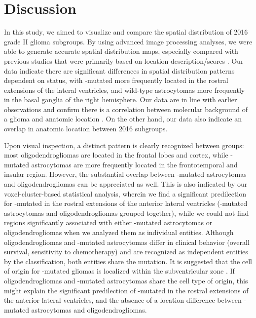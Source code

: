 \section{Discussion}
In this study, we aimed to visualize and compare the spatial distribution of  2016 grade II glioma subgroups.
By using advanced image processing analyses, we were able to generate accurate spatial distribution maps, especially compared with previous studies that were primarily based on location description/scores \autocite{stockhammer2012idh1, goze2009lack, laigle2004correlations, metellus2010absence}.
Our data indicate there are significant differences in spatial distribution patterns dependent on  status, with -mutated  more frequently located in the rostral extensions of the lateral ventricles, and  wild-type astrocytomas more frequently in the basal ganglia of the right hemisphere.
Our data are in line with earlier observations and confirm there is a correlation between molecular background of a glioma and anatomic location \autocite{stockhammer2012idh1, goze2009lack, laigle2004correlations, metellus2010absence, tejada2018voxel}.
On the other hand, our data also indicate an overlap in anatomic location between  2016 subgroups.

Upon visual inspection, a distinct pattern is clearly recognized between groups: most oligodendrogliomas are located in the frontal lobes and cortex, while -mutated astrocytomas are more frequently located in the frontotemporal and insular region.
However, the substantial overlap between -mutated astrocytomas and oligodendrogliomas can be appreciated as well.
This is also indicated by our voxel-cluster-based statistical analysis, wherein we find a significant predilection for -mutated  in the rostral extensions of the anterior lateral ventricles (-mutated astrocytomas and oligodendrogliomas grouped together), while we could not find regions significantly associated with either -mutated astrocytomas or oligodendrogliomas when we analyzed them as individual entities.
Although oligodendrogliomas and -mutated astrocytomas differ in clinical behavior (overall survival, sensitivity to chemotherapy) and are recognized as independent entities by the  classification, both entities share the  mutation.
It is suggested that the cell of origin for -mutated gliomas is localized within the subventricular zone \autocite{sanai2005neural}.
If oligodendrogliomas and -mutated astrocytomas share the cell type of origin, this might explain the significant predilection of -mutated  in the rostral extensions of the anterior lateral ventricles, and the absence of a location difference between -mutated astrocytomas and oligodendrogliomas.

